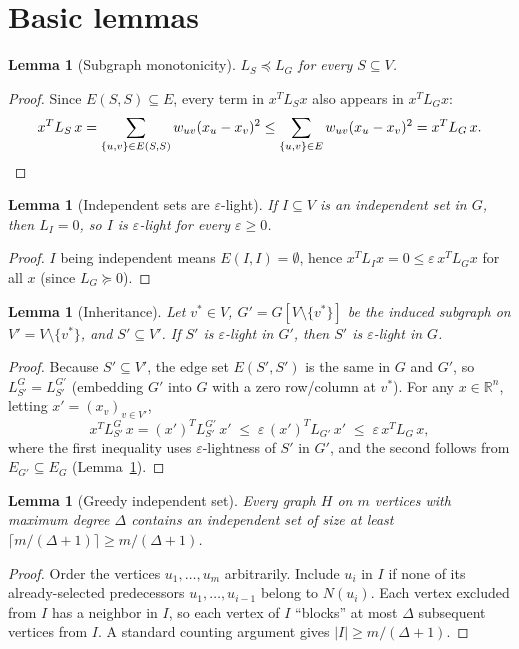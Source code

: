 \documentclass[12pt]{article}
\newtheorem{lemma}[theorem]{Lemma}
\theoremstyle{definition}
\begin{document}
\section{Basic lemmas}

\begin{lemma}[Subgraph monotonicity]\label{lem:mono}
$L_S\preceq L_G$ for every $S\subseteq V$.
\end{lemma}
\begin{proof}
Since $E(S,S)\subseteq E$, every term in $x^TL_S x$ also appears in $x^TL_G x$:
\[
   x^T L_S\, x
   = \sum_{\{u,v\}\in E(S,S)} w_{uv}(x_u-x_v)^2
   \le \sum_{\{u,v\}\in E} w_{uv}(x_u-x_v)^2
   = x^T L_G\, x.
   \qedhere
\]
\end{proof}

\begin{lemma}[Independent sets are $\varepsilon$-light]\label{lem:indep}
If $I\subseteq V$ is an independent set in $G$, then $L_I=0$, so $I$ is
$\varepsilon$-light for every $\varepsilon\ge 0$.
\end{lemma}
\begin{proof}
$I$ being independent means $E(I,I)=\emptyset$, hence $x^T L_I x=0\le\varepsilon\,x^TL_G x$
for all $x$ (since $L_G\succeq 0$).
\end{proof}

\begin{lemma}[Inheritance]\label{lem:inherit}
Let $v^*\in V$, $G'=G[V\setminus\{v^*\}]$ be the induced subgraph on
$V'=V\setminus\{v^*\}$, and $S'\subseteq V'$.
If $S'$ is $\varepsilon$-light in $G'$, then $S'$ is $\varepsilon$-light in $G$.
\end{lemma}
\begin{proof}
Because $S'\subseteq V'$, the edge set $E(S',S')$ is the same in $G$ and $G'$,
so $L_{S'}^G = L_{S'}^{G'}$ (embedding $G'$ into $G$ with a zero row/column at $v^*$).
For any $x\in\mathbb{R}^n$, letting $x'=(x_v)_{v\in V'}$,
\[
   x^T L_{S'}^G\, x
   = (x')^T L_{S'}^{G'}\, x'
   \;\le\; \varepsilon\,(x')^T L_{G'}\, x'
   \;\le\; \varepsilon\, x^T L_G\, x,
\]
where the first inequality uses $\varepsilon$-lightness of $S'$ in $G'$, and the
second follows from $E_{G'}\subseteq E_G$ (Lemma~\ref{lem:mono}).
\end{proof}

\begin{lemma}[Greedy independent set]\label{lem:greedy}
Every graph $H$ on $m$ vertices with maximum degree $\Delta$ contains an
independent set of size at least $\lceil m/(\Delta+1)\rceil\ge m/(\Delta+1)$.
\end{lemma}
\begin{proof}
Order the vertices $u_1,\dots,u_m$ arbitrarily.  Include $u_i$ in $I$ if none
of its already-selected predecessors $u_1,\dots,u_{i-1}$ belong to $N(u_i)$.
Each vertex excluded from $I$ has a neighbor in $I$, so each vertex of $I$
``blocks'' at most $\Delta$ subsequent vertices from $I$.  A standard counting
argument gives $|I|\ge m/(\Delta+1)$.
\end{proof}
\end{document}
